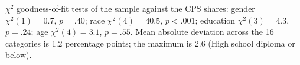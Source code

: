 $\chi^2$ goodness-of-fit tests of the sample against the CPS shares: gender $\chi^2(1)=0.7$, $p=.40$; race $\chi^2(4)=40.5$, $p<.001$; education $\chi^2(3)=4.3$, $p=.24$; age $\chi^2(4)=3.1$, $p=.55$. Mean absolute deviation across the 16 categories is 1.2 percentage points; the maximum is 2.6 (High school diploma or below).
